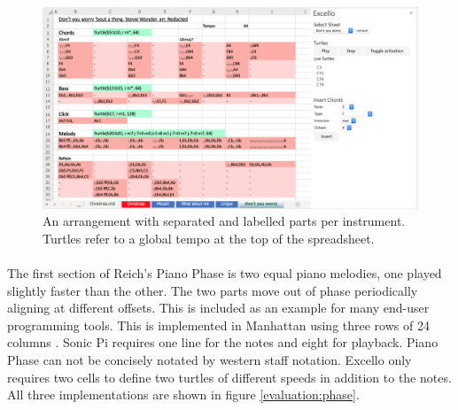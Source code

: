 \begin{figure}[tbh]
\centerline{\includegraphics[width=150mm]{figs/excelloFranzRedacted.png}}
\caption{An arrangement with separated and labelled parts per instrument. Turtles refer to a global tempo at the top of the spreadsheet.}
\label{evaluation:excelloFranzRedacted}
\end{figure}

\paragraph{} The first section of Reich's Piano Phase is two equal piano melodies, one played slightly faster than the other. The two parts move out of phase periodically aligning at different offsets. This is included as an example for many end-user programming tools. This is implemented in Manhattan using three rows of 24 columns \cite{nash:manhattan}. Sonic Pi requires one line for the notes and eight for playback. Piano Phase can not be concisely notated by western staff notation. Excello only requires two cells to define two turtles of different speeds in addition to the notes. All three implementations are shown in figure \ref{evaluation:phase}.


